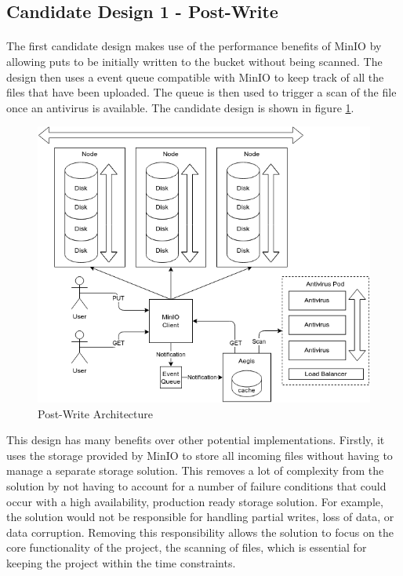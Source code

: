 \documentclass[12pt, conference, final, a4paper, onecolumn, compsoc]{IEEEtran}
\begin{document}
\subsection{Candidate Design 1 - Post-Write}
\paragraph{}

The first candidate design makes use of the performance benefits of MinIO by
allowing puts to be initially written to the bucket without being scanned. The
design then uses a event queue compatible with MinIO to keep track of all the
files that have been uploaded. The queue is then used to trigger a scan of the
file once an antivirus is available. The candidate design is shown in figure
\ref{fig:postWriteArch}.

\begin{figure}
  \includegraphics[scale=.4]{diagrams/post-write.png}
  \caption{Post-Write Architecture}
  \label{fig:postWriteArch}
\end{figure}

This design has many benefits over other potential implementations. Firstly, it
uses the storage provided by MinIO to store all incoming files without having to
manage a separate storage solution. This removes a lot of complexity from the
solution by not having to account for a number of failure conditions that could
occur with a high availability, production ready storage solution. For example,
the solution would not be responsible for handling partial writes, loss of data,
or data corruption. Removing this responsibility allows the solution to focus on
the core functionality of the project, the scanning of files, which is essential
for keeping the project within the time constraints.
\end{document}
